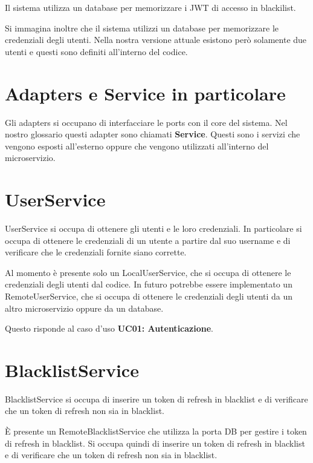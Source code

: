 Il sistema utilizza un database per memorizzare i JWT di accesso in blackilist.

Si immagina inoltre che il sistema utilizzi un database per memorizzare le credenziali degli utenti. Nella nostra versione attuale esistono però solamente due utenti e questi sono definiti all'interno del codice.




\section{Adapters e Service in particolare}

Gli adapters si occupano di interfacciare le ports con il core del sistema. Nel nostro glossario questi adapter sono chiamati \textbf{Service}. Questi sono i servizi che vengono esposti all'esterno oppure che vengono utilizzati all'interno del microservizio.

\section{UserService}

UserService si occupa di ottenere gli utenti e le loro credenziali. In particolare si occupa di ottenere le credenziali di un utente a partire dal suo username e di verificare che le credenziali fornite siano corrette.

Al momento è presente solo un LocalUserService, che si occupa di ottenere le credenziali degli utenti dal codice. In futuro potrebbe essere implementato un RemoteUserService, che si occupa di ottenere le credenziali degli utenti da un altro microservizio oppure da un database.

Questo risponde al caso d'uso \textbf{UC01: Autenticazione}.

\section{BlacklistService}

BlacklistService si occupa di inserire un token di refresh in blacklist e di verificare che un token di refresh non sia in blacklist.

È presente un RemoteBlacklistService che utilizza la porta DB per gestire i token di refresh in blacklist. Si occupa quindi di inserire un token di refresh in blacklist e di verificare che un token di refresh non sia in blacklist.

